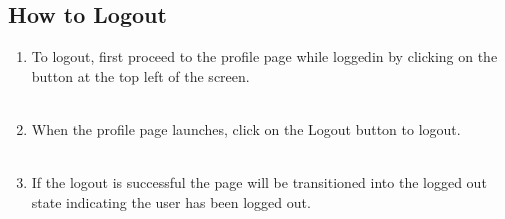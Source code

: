 \documentclass[12pt,a4paper]{article}
\begin{document}
			\subsection{How to Logout}
				\begin{enumerate}
					\item To logout, first proceed to the profile page while loggedin by clicking on the button at 
						the top left of the screen.\\\\
						\newpage
					\item When the profile page launches, click on the Logout button to logout.\\\\
					\item If the logout is successful the page will be transitioned into the logged out state 
						indicating the user has been logged out.\\\\
				\end{enumerate}
\end{document}
